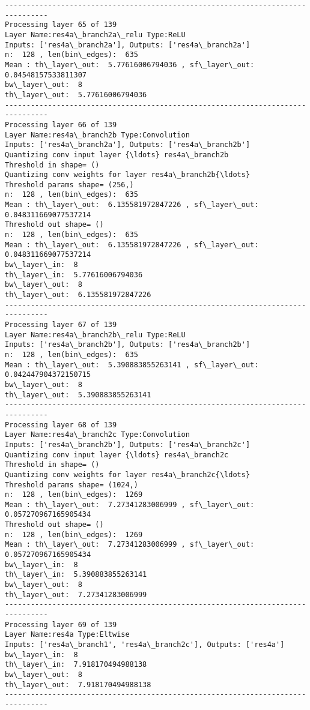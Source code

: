 \documentclass[11pt]{article}
\begin{document}
\begin{Verbatim}[commandchars=\\\{\}]
--------------------------------------------------------------------------------
Processing layer 65 of 139
Layer Name:res4a\_branch2a\_relu Type:ReLU
Inputs: ['res4a\_branch2a'], Outputs: ['res4a\_branch2a']
n:  128 , len(bin\_edges):  635
Mean : th\_layer\_out:  5.77616006794036 , sf\_layer\_out:  0.04548157533811307
bw\_layer\_out:  8
th\_layer\_out:  5.77616006794036
--------------------------------------------------------------------------------
Processing layer 66 of 139
Layer Name:res4a\_branch2b Type:Convolution
Inputs: ['res4a\_branch2a'], Outputs: ['res4a\_branch2b']
Quantizing conv input layer {\ldots} res4a\_branch2b
Threshold in shape= ()
Quantizing conv weights for layer res4a\_branch2b{\ldots}
Threshold params shape= (256,)
n:  128 , len(bin\_edges):  635
Mean : th\_layer\_out:  6.135581972847226 , sf\_layer\_out:  0.048311669077537214
Threshold out shape= ()
n:  128 , len(bin\_edges):  635
Mean : th\_layer\_out:  6.135581972847226 , sf\_layer\_out:  0.048311669077537214
bw\_layer\_in:  8
th\_layer\_in:  5.77616006794036
bw\_layer\_out:  8
th\_layer\_out:  6.135581972847226
--------------------------------------------------------------------------------
Processing layer 67 of 139
Layer Name:res4a\_branch2b\_relu Type:ReLU
Inputs: ['res4a\_branch2b'], Outputs: ['res4a\_branch2b']
n:  128 , len(bin\_edges):  635
Mean : th\_layer\_out:  5.390883855263141 , sf\_layer\_out:  0.042447904372150715
bw\_layer\_out:  8
th\_layer\_out:  5.390883855263141
--------------------------------------------------------------------------------
Processing layer 68 of 139
Layer Name:res4a\_branch2c Type:Convolution
Inputs: ['res4a\_branch2b'], Outputs: ['res4a\_branch2c']
Quantizing conv input layer {\ldots} res4a\_branch2c
Threshold in shape= ()
Quantizing conv weights for layer res4a\_branch2c{\ldots}
Threshold params shape= (1024,)
n:  128 , len(bin\_edges):  1269
Mean : th\_layer\_out:  7.27341283006999 , sf\_layer\_out:  0.057270967165905434
Threshold out shape= ()
n:  128 , len(bin\_edges):  1269
Mean : th\_layer\_out:  7.27341283006999 , sf\_layer\_out:  0.057270967165905434
bw\_layer\_in:  8
th\_layer\_in:  5.390883855263141
bw\_layer\_out:  8
th\_layer\_out:  7.27341283006999
--------------------------------------------------------------------------------
Processing layer 69 of 139
Layer Name:res4a Type:Eltwise
Inputs: ['res4a\_branch1', 'res4a\_branch2c'], Outputs: ['res4a']
bw\_layer\_in:  8
th\_layer\_in:  7.918170494988138
bw\_layer\_out:  8
th\_layer\_out:  7.918170494988138
--------------------------------------------------------------------------------

\end{Verbatim}
\end{document}
